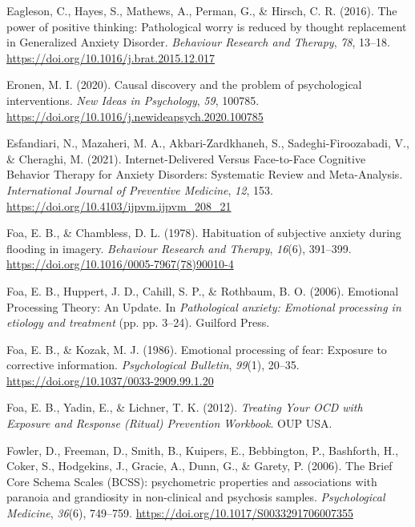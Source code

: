 \documentclass[
  man,floatsintext]{apa7}
\newlength{\cslhangindent}
\newlength{\cslentryspacingunit} %
\newenvironment{CSLReferences}[2] %
 {%
  \setlength{\parindent}{0pt}
  \ifodd #1
  \let\oldpar\par
  \def\par{\hangindent=\cslhangindent\oldpar}
  \fi
  \setlength{\parskip}{#2\cslentryspacingunit}
 }%
 {}
\begin{document}
\begin{CSLReferences}{1}{0}
\leavevmode{}%
Eagleson, C., Hayes, S., Mathews, A., Perman, G., \& Hirsch, C. R. (2016). The power of positive thinking: Pathological worry is reduced by thought replacement in Generalized Anxiety Disorder. \emph{Behaviour Research and Therapy}, \emph{78}, 13--18. \url{https://doi.org/10.1016/j.brat.2015.12.017}

\leavevmode{}%
Eronen, M. I. (2020). Causal discovery and the problem of psychological interventions. \emph{New Ideas in Psychology}, \emph{59}, 100785. \url{https://doi.org/10.1016/j.newideapsych.2020.100785}

\leavevmode{}%
Esfandiari, N., Mazaheri, M. A., Akbari-Zardkhaneh, S., Sadeghi-Firoozabadi, V., \& Cheraghi, M. (2021). Internet-Delivered Versus Face-to-Face Cognitive Behavior Therapy for Anxiety Disorders: Systematic Review and Meta-Analysis. \emph{International Journal of Preventive Medicine}, \emph{12}, 153. \url{https://doi.org/10.4103/ijpvm.ijpvm_208_21}

\leavevmode{}%
Foa, E. B., \& Chambless, D. L. (1978). Habituation of subjective anxiety during flooding in imagery. \emph{Behaviour Research and Therapy}, \emph{16}(6), 391--399. \url{https://doi.org/10.1016/0005-7967(78)90010-4}

\leavevmode{}%
Foa, E. B., Huppert, J. D., Cahill, S. P., \& Rothbaum, B. O. (2006). Emotional Processing Theory: An Update. In \emph{Pathological anxiety: Emotional processing in etiology and treatment} (pp. pp. 3--24). Guilford Press.

\leavevmode{}%
Foa, E. B., \& Kozak, M. J. (1986). Emotional processing of fear: Exposure to corrective information. \emph{Psychological Bulletin}, \emph{99}(1), 20--35. \url{https://doi.org/10.1037/0033-2909.99.1.20}

\leavevmode{}%
Foa, E. B., Yadin, E., \& Lichner, T. K. (2012). \emph{Treating Your OCD with Exposure and Response (Ritual) Prevention Workbook}. OUP USA.

\leavevmode{}%
Fowler, D., Freeman, D., Smith, B., Kuipers, E., Bebbington, P., Bashforth, H., Coker, S., Hodgekins, J., Gracie, A., Dunn, G., \& Garety, P. (2006). The Brief Core Schema Scales (BCSS): psychometric properties and associations with paranoia and grandiosity in non-clinical and psychosis samples. \emph{Psychological Medicine}, \emph{36}(6), 749--759. \url{https://doi.org/10.1017/S0033291706007355}


\end{CSLReferences}
\end{document}
